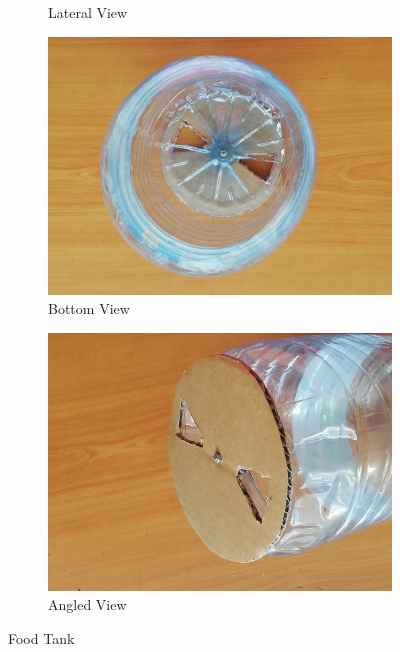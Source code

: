 \begin{figure}[h]
\begin{subfigure}[b]{0.49\textwidth}
        \caption{Lateral View}
        \label{fig:mamaKabi2}
    \end{subfigure}
    \begin{subfigure}[b]{0.49\textwidth}
        \includegraphics[width=\textwidth]{img/tank3.jpg}
        \caption{Bottom View}
        \label{fig:mamaKabi3}
    \end{subfigure}
     \begin{subfigure}[b]{0.49\textwidth}
        \includegraphics[width=\textwidth]{img/tank4.jpg}
        \caption{Angled View}
        \label{fig:mamaKabi4} 
    \end{subfigure}
    \caption{Food Tank}
    \label{fig:mamaKabi}
\end{figure}

